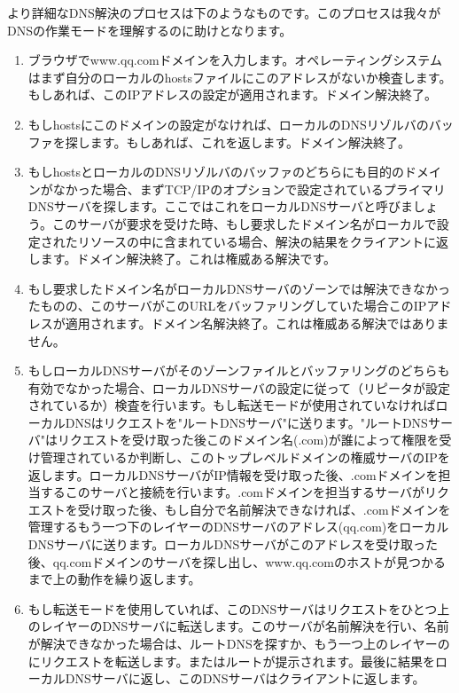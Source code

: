 より詳細なDNS解決のプロセスは下のようなものです。このプロセスは我々がDNSの作業モードを理解するのに助けとなります。

\begin{enumerate}
  \item ブラウザでwww.qq.comドメインを入力します。オペレーティングシステムはまず自分のローカルのhostsファイルにこのアドレスがないか検査します。もしあれば、このIPアドレスの設定が適用されます。ドメイン解決終了。
  \item もしhostsにこのドメインの設定がなければ、ローカルのDNSリゾルバのバッファを探します。もしあれば、これを返します。ドメイン解決終了。
  \item もしhostsとローカルのDNSリゾルバのバッファのどちらにも目的のドメインがなかった場合、まずTCP/IPのオプションで設定されているプライマリDNSサーバを探します。ここではこれをローカルDNSサーバと呼びましょう。このサーバが要求を受けた時、もし要求したドメイン名がローカルで設定されたリソースの中に含まれている場合、解決の結果をクライアントに返します。ドメイン解決終了。これは権威ある解決です。
  \item もし要求したドメイン名がローカルDNSサーバのゾーンでは解決できなかったものの、このサーバがこのURLをバッファリングしていた場合このIPアドレスが適用されます。ドメイン名解決終了。これは権威ある解決ではありません。
  \item もしローカルDNSサーバがそのゾーンファイルとバッファリングのどちらも有効でなかった場合、ローカルDNSサーバの設定に従って（リピータが設定されているか）検査を行います。もし転送モードが使用されていなければローカルDNSはリクエストを"ルートDNSサーバ"に送ります。"ルートDNSサーバ"はリクエストを受け取った後このドメイン名(.com)が誰によって権限を受け管理されているか判断し、このトップレベルドメインの権威サーバのIPを返します。ローカルDNSサーバがIP情報を受け取った後、.comドメインを担当するこのサーバと接続を行います。.comドメインを担当するサーバがリクエストを受け取った後、もし自分で名前解決できなければ、.comドメインを管理するもう一つ下のレイヤーのDNSサーバのアドレス(qq.com)をローカルDNSサーバに送ります。ローカルDNSサーバがこのアドレスを受け取った後、qq.comドメインのサーバを探し出し、www.qq.comのホストが見つかるまで上の動作を繰り返します。
  \item もし転送モードを使用していれば、このDNSサーバはリクエストをひとつ上のレイヤーのDNSサーバに転送します。このサーバが名前解決を行い、名前が解決できなかった場合は、ルートDNSを探すか、もう一つ上のレイヤーのにリクエストを転送します。またはルートが提示されます。最後に結果をローカルDNSサーバに返し、このDNSサーバはクライアントに返します。
\end{enumerate}


